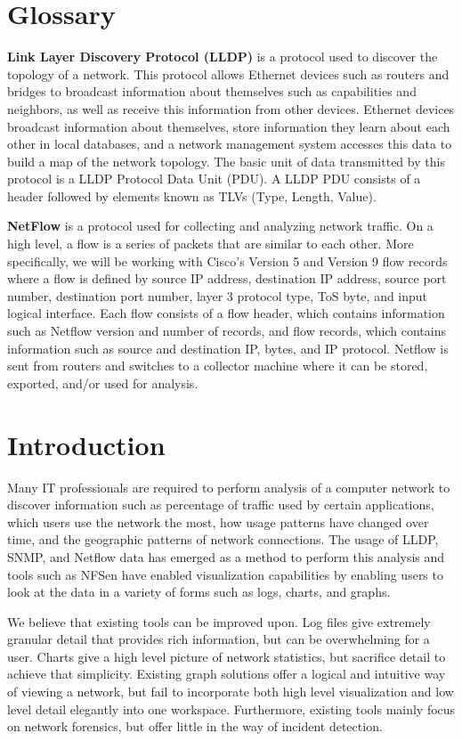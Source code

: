 \documentclass{sig-alternate}
\begin{document}
\section*{Glossary}

\textbf{Link Layer Discovery Protocol (LLDP)} is a protocol used to discover the
topology of a network. This protocol allows Ethernet devices such as routers and
bridges to broadcast information about themselves such as capabilities and
neighbors, as well as receive this information from other devices.  Ethernet
devices broadcast information about themselves, store information they learn
about each other in local databases, and a network management system accesses
this data to build a map of the network topology. The basic unit of data
transmitted by this protocol is a LLDP Protocol Data Unit (PDU). A LLDP PDU
consists of a header followed by elements known as TLVs (Type, Length, Value).

\textbf{NetFlow} is a protocol used for collecting and analyzing network
traffic. On a high level, a flow is a series of packets that are similar to each
other. More specifically, we will be working with Cisco's Version 5 and Version
9 flow records where a flow is defined by source IP address, destination IP
address, source port number, destination port number, layer 3 protocol type, ToS
byte, and input logical interface. Each flow consists of a flow header, which
contains information such as Netflow version and number of records, and flow
records, which contains information such as source and destination IP, bytes,
and IP protocol. Netflow is sent from routers and switches to a collector
machine where it can be stored, exported, and/or used for analysis.

\section{Introduction}

Many IT professionals are required to perform analysis of a computer network to
discover information such as percentage of traffic used by certain applications,
which users use the network the most, how usage patterns have changed over time,
and the geographic patterns of network connections. The usage of LLDP, SNMP, and
Netflow data has emerged as a method to perform this analysis and tools such as
NFSen have enabled visualization capabilities by enabling users to look at the
data in a variety of forms such as logs, charts, and graphs.

We believe that existing tools can be improved upon. Log files give extremely
granular detail that provides rich information, but can be overwhelming for a
user. Charts give a high level picture of network statistics, but sacrifice
detail to achieve that simplicity. Existing graph solutions offer a logical and
intuitive way of viewing a network, but fail to incorporate both high level
visualization and low level detail elegantly into one workspace. Furthermore,
existing tools mainly focus on network forensics, but offer little in the way of
incident detection.
\end{document}
